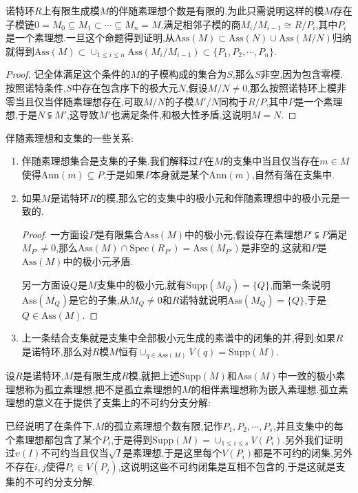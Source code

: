 诺特环$R$上有限生成模$M$的伴随素理想个数是有限的.为此只需说明这样的模$M$存在子模链$0=M_0\subseteq M_1\subset\cdots\subseteq M_n=M$,满足相邻子模的商$M_i/M_{i-1}\cong R/P_i$,其中$P_i$是一个素理想.一旦这个命题得到证明,从$\mathrm{Ass}(M)\subset\mathrm{Ass}(N)\cup\mathrm{Ass}(M/N)$归纳就得到$\mathrm{Ass}(M)\subset\cup_{1\le i\le n}\mathrm{Ass}(M_i/M_{i-1})\subset\{P_1,P_2,\cdots,P_n\}$.
\begin{proof}
	
	记全体满足这个条件的$M$的子模构成的集合为$S$,那么$S$非空,因为包含零模.按照诺特条件,$S$中存在包含序下的极大元$N$,假设$M/N\not=0$,那么按照诺特环上模非零当且仅当伴随素理想存在,可取$M/N$的子模$M'/N$同构于$R/P$,其中$P$是一个素理想,于是$N\subsetneqq M'$,这导致$M'$也满足条件,和极大性矛盾,这说明$M=N$.
\end{proof}

伴随素理想和支集的一些关系:
\begin{enumerate}
	\item 伴随素理想集合是支集的子集.我们解释过$P$在$M$的支集中当且仅当存在$m\in M$使得$\mathrm{Ann}(m)\subseteq P$,于是如果$P$本身就是某个$\mathrm{Ann}(m)$,自然有落在支集中.
	\item 如果$M$是诺特环$R$的模,那么它的支集中的极小元和伴随素理想中的极小元是一致的.
	\begin{proof}
		
		一方面设$P$是有限集合$\mathrm{Ass}(M)$中的极小元,假设存在素理想$P'\subsetneqq P$满足$M_{P'}\not=0$,那么$\mathrm{Ass}(M)\cap\mathrm{Spec}(R_{P'})=\mathrm{Ass}(M_{P'})$是非空的,这就和$P$是$\mathrm{Ass}(M)$中的极小元矛盾.
		
		另一方面设$Q$是$M$支集中的极小元,就有$\mathrm{Supp}(M_Q)=\{Q\}$,而第一条说明$\mathrm{Ass}(M_Q)$是它的子集,从$M_Q\not=0$和$R$诺特就说明$\mathrm{Ass}(M_Q)=\{Q\}$,于是$Q\in\mathrm{Ass}(M)$.
	\end{proof}
	\item 上一条结合支集就是支集中全部极小元生成的素谱中的闭集的并,得到:如果$R$是诺特环,那么对$R$模$M$恒有$\cup_{q\in\mathrm{Ass}(M)}V(q)=\mathrm{Supp}(M)$.
\end{enumerate}

设$R$是诺特环,$M$是有限生成$R$模,就把上述$\mathrm{Supp}(M)$和$\mathrm{Ass}(M)$中一致的极小素理想称为孤立素理想,把不是孤立素理想的$M$的相伴素理想称为嵌入素理想.孤立素理想的意义在于提供了支集上的不可约分支分解:

已经说明了在条件下,$M$的孤立素理想个数有限,记作$P_1,P_2,\cdots,P_s$,并且支集中的每个素理想都包含了某个$P_i$,于是得到$\mathrm{Supp}(M)=\cup_{1\le i\le s}V(P_i)$.另外我们证明过$v(I)$不可约当且仅当$\sqrt{I}$是素理想,于是这里每个$V(P_i)$都是不可约的闭集,另外不存在$i,j$使得$P_i\in V(P_j)$,这说明这些不可约闭集是互相不包含的,于是这就是支集的不可约分支分解.

